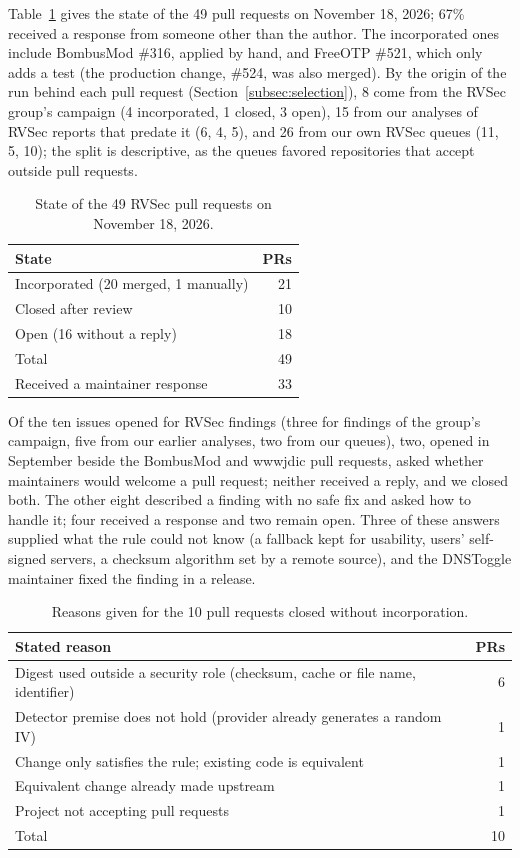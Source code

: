 \documentclass[conference]{IEEEtran}
\begin{document}
Table~\ref{tab:pr-state} gives the state of the 49 pull requests on November
18, 2026; 67\% received a response from someone other than the author. The
incorporated ones include BombusMod \#316, applied by hand, and FreeOTP \#521,
which only adds a test (the production change, \#524, was also merged). By the
origin of the run behind each pull request (Section~\ref{subsec:selection}), 8
come from the RVSec group's campaign (4 incorporated, 1 closed, 3 open), 15 from
our analyses of RVSec reports that predate it (6, 4, 5), and 26 from our own
RVSec queues (11, 5, 10); the split is descriptive, as the queues favored
repositories that accept outside pull requests.

\begin{table}[H]
\centering
\caption{State of the 49 RVSec pull requests on November 18, 2026.}
\label{tab:pr-state}
\begin{tabular}{lr}
\toprule
State & PRs \\
\midrule
Incorporated (20 merged, 1 manually) & 21 \\
Closed after review                  & 10 \\
Open (16 without a reply)            & 18 \\
\midrule
Total                                & 49 \\
Received a maintainer response       & 33 \\
\bottomrule
\end{tabular}
\end{table}

Of the ten issues opened for RVSec findings (three for findings of the
group's campaign, five from our earlier analyses, two from our queues), two,
opened in September beside
the BombusMod and wwwjdic pull requests, asked whether maintainers would
welcome a pull request; neither received a reply, and we closed both. The other
eight described a finding with no safe fix and asked how to handle it; four
received a response and two remain open. Three of these answers supplied what
the rule could not know (a fallback kept for usability, users' self-signed
servers, a checksum algorithm set by a remote source), and the DNSToggle
maintainer fixed the finding in a release.

\begin{table}[H]
\centering
\caption{Reasons given for the 10 pull requests closed without
incorporation.}
\label{tab:closures}
\footnotesize
\begin{tabular}{p{5.8cm}r}
\toprule
Stated reason & PRs \\
\midrule
Digest used outside a security role (checksum, cache or file name,
identifier) & 6 \\
Detector premise does not hold (provider already generates a random IV) & 1 \\
Change only satisfies the rule; existing code is equivalent & 1 \\
Equivalent change already made upstream & 1 \\
Project not accepting pull requests & 1 \\
\midrule
Total & 10 \\
\bottomrule
\end{tabular}
\end{table}
\end{document}
